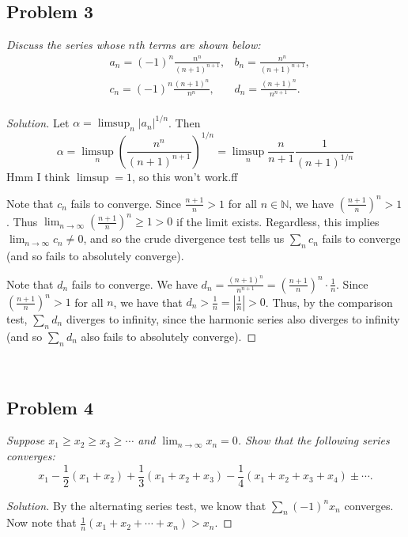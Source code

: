 \documentclass{article}
\newcommand{\N}{{\mathbb N}}
\begin{document}
\subsection*{Problem 3}
{\it Discuss the series whose $n$th terms are shown below:
\begin{align*}
	&a_n = (-1)^n\frac{n^n}{(n+1)^{n+1}},
	&b_n = \frac{n^n}{(n+1)^{n+1}},\\
	&c_n = (-1)^n\frac{(n+1)^n}{n^n},
	&d_n = \frac{(n+1)^n}{n^{n+1}}.\\
\end{align*}

\begin{proof}[Solution]\let\qed\relax
	Let $\alpha = \limsup_n |a_n|^{1/n}$.
	Then
	\[
		\alpha = \limsup_n \left(\frac{n^n}{(n+1)^{n+1}}\right)^{1/n}
		= \limsup_n \frac{n}{n+1}\frac{1}{(n+1)^{1/n}}
	\]
	Hmm I think $\limsup = 1$, so this won't work.ff

	Note that $c_n$ fails to converge.
	Since $\frac{n+1}{n} > 1$ for all $n \in \N$,
	we have $\left(\frac{n+1}{n}\right)^n > 1$.
	Thus $\lim_{n\to\infty} \left(\frac{n+1}{n}\right)^n \geq 1 > 0$
	if the limit exists.
	Regardless, this implies $\lim_{n\to\infty}c_n \neq 0$,
	and so the crude divergence test tells us $\sum_n c_n$ fails to converge
	(and so fails to absolutely converge).

	Note that $d_n$ fails to converge.
	We have $d_n = \frac{(n+1)^n}{n^{n+1}} = \left(\frac{n+1}{n}\right)^n\cdot\frac{1}{n}$.
	Since $\left(\frac{n+1}{n}\right)^n > 1$ for all $n$,
	we have that $d_n > \frac{1}{n} = \left\lvert \frac{1}{n}\right\rvert> 0$.
	Thus, by the comparison test, $\sum_n d_n$ diverges to infinity,
	since the harmonic series also diverges to infinity
	(and so $\sum_n d_n$ also fails to absolutely converge).
\end{proof}
\clearpage
~\clearpage

\subsection*{Problem 4}
{\it Suppose $x_1 \geq x_2 \geq x_3 \geq \cdots$ and $\lim_{n \to \infty}x_n = 0$.
Show that the following series converges:
\[
	x_1 - \frac{1}{2}(x_1 + x_2) + \frac{1}{3}(x_1 + x_2 + x_3)
	- \frac{1}{4}(x_1 + x_2 + x_3 + x_4) \pm \cdots.
\]}
\begin{proof}[Solution]\let\qed\relax
	By the alternating series test, we know that $\sum_n(-1)^n x_n$ converges.
	Now note that $\frac{1}{n}(x_1 + x_2 + \cdots + x_n) > x_n$.


\end{proof}}
\end{document}
